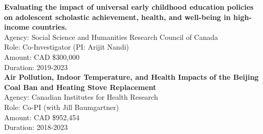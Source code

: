 \documentclass[
  letterpaper,
  DIV=11,
  numbers=noendperiod]{scrartcl}
\begin{document}
\textbf{Evaluating the impact of universal early childhood education
policies on adolescent scholastic achievement, health, and well-being in
high-income countries.}\\
\hspace*{0.333em}\hspace*{0.333em}\hspace*{0.333em}Agency: Social
Science and Humanities Research Council of Canada\\
\hspace*{0.333em}\hspace*{0.333em}\hspace*{0.333em}Role: Co-Investigator
(PI: Arijit Nandi)\\
\hspace*{0.333em}\hspace*{0.333em}\hspace*{0.333em}Amount: CAD
\$300,000\\
\hspace*{0.333em}\hspace*{0.333em}\hspace*{0.333em}Duration: 2019-2023\\

\textbf{Air Pollution, Indoor Temperature, and Health Impacts of the
Beijing Coal Ban and Heating Stove Replacement}\\
\hspace*{0.333em}\hspace*{0.333em}\hspace*{0.333em}Agency: Canadian
Institutes for Health Research\\
\hspace*{0.333em}\hspace*{0.333em}\hspace*{0.333em}Role: Co-PI (with
Jill Baumgartner)\\
\hspace*{0.333em}\hspace*{0.333em}\hspace*{0.333em}Amount: CAD
\$952,454\\
\hspace*{0.333em}\hspace*{0.333em}\hspace*{0.333em}Duration: 2018-2023\\
\end{document}
